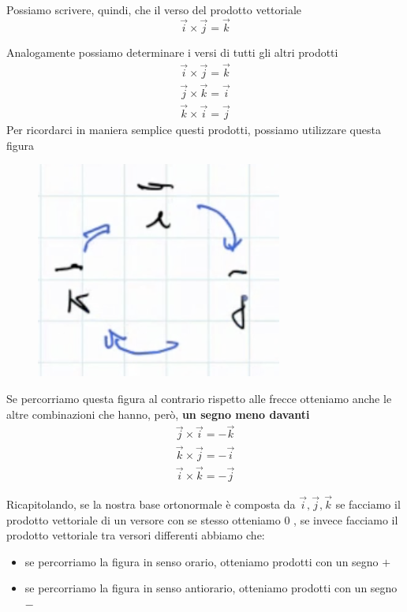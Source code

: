 \documentclass[a4paper]{book}
\begin{document}
Possiamo scrivere, quindi, che il verso del prodotto vettoriale
$$ \overrightarrow{i} \times \overrightarrow{j} = \overrightarrow{k} $$

Analogamente possiamo determinare i versi di tutti gli altri prodotti
\begin{align*}
\overrightarrow{i} \times \overrightarrow{j} = \overrightarrow{k} \\
\overrightarrow{j} \times \overrightarrow{k} = \overrightarrow{i} \\
\overrightarrow{k} \times \overrightarrow{i} = \overrightarrow{j}
\end{align*}
\newpage
Per ricordarci in maniera semplice questi prodotti, possiamo utilizzare questa figura

\begin{figure}[h]
\begin{center}
\includegraphics[width = 0.5 \textwidth]{vettoriale5}
\label{fig:vettoriale5}
\end{center}
\end{figure}

Se percorriamo questa figura al contrario rispetto alle frecce otteniamo anche le altre combinazioni che hanno, però, \textbf{un segno meno davanti}
\begin{align*}
\overrightarrow{j} \times \overrightarrow{i} = - \overrightarrow{k} \\
\overrightarrow{k} \times \overrightarrow{j} = - \overrightarrow{i} \\
\overrightarrow{i} \times \overrightarrow{k} = - \overrightarrow{j}
\end{align*}

Ricapitolando, se la nostra base ortonormale è composta da $ {\overrightarrow{i}, \overrightarrow{j}, \overrightarrow{k}} $ se facciamo il prodotto vettoriale di un versore con se stesso otteniamo 0 , se invece facciamo il prodotto vettoriale tra versori differenti abbiamo che:
\begin{itemize}
\item se percorriamo la figura in senso orario, otteniamo prodotti con un segno $ + $
\item se percorriamo la figura in senso antiorario, otteniamo prodotti con un segno $ - $
\end{itemize}
\end{document}
